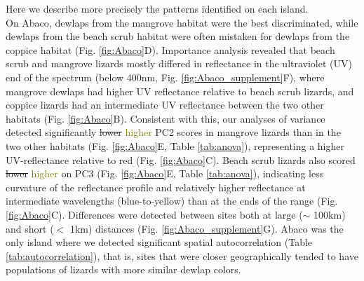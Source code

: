 Here we describe more precisely the patterns identified on each island.\\

On Abaco, dewlaps from the mangrove habitat were the best discriminated, while dewlaps from the beach scrub habitat were often mistaken for dewlaps from the coppice habitat (Fig. \ref{fig:Abaco}D). Importance analysis revealed that beach scrub and mangrove lizards mostly differed in reflectance in the ultraviolet (UV) end of the spectrum (below 400nm, Fig. \ref{fig:Abaco_supplement}F), where mangrove dewlaps had higher UV reflectance relative to beach scrub lizards, and coppice lizards had an intermediate UV reflectance between the two other habitats (Fig. \ref{fig:Abaco}B). Consistent with this, our analyses of variance detected significantly \sout{lower} \textcolor{olive}{higher} PC2 scores in mangrove lizards than in the two other habitats (Fig. \ref{fig:Abaco}E, Table \ref{tab:anova}), representing a higher UV-reflectance relative to red (Fig. \ref{fig:Abaco}C). Beach scrub lizards also scored \sout{lower} \textcolor{olive}{higher} on PC3 (Fig. \ref{fig:Abaco}E, Table \ref{tab:anova}), indicating less curvature of the reflectance profile and relatively higher reflectance at intermediate wavelengths (blue-to-yellow) than at the ends of the range (Fig. \ref{fig:Abaco}C). Differences were detected between sites both at large ($\sim$ 100km) and short ($<$ 1km) distances (Fig. \ref{fig:Abaco_supplement}G). Abaco was the only island where we detected significant spatial autocorrelation (Table \ref{tab:autocorrelation}), that is, sites that were closer geographically tended to have populations of lizards with more similar dewlap colors.\\

